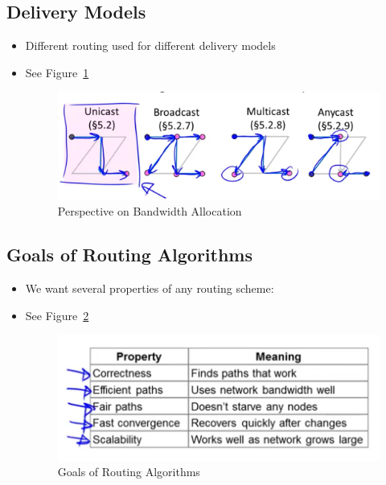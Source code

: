 \documentclass[12pt]{ctexart}   %
\begin{document}
	\subsection{Delivery Models}
	\begin{itemize}
		\item Different routing used for different delivery models
		\item See Figure~\ref{fig:5-1-4}
		
		\begin{figure}[h!] %
		\centering
		 \includegraphics[scale=0.7]{images/5-1-4}
		\caption{ Perspective on Bandwidth Allocation }
		 \label{fig:5-1-4}
		 \end{figure}
	\end{itemize}
	
	\subsection{Goals of Routing Algorithms}
	\begin{itemize}
		\item We want several properties of any routing scheme:
		\item See Figure~\ref{fig:5-1-5}
		
		\begin{figure}[h!] %
		\centering
		 \includegraphics[scale=0.7]{images/5-1-5}
		\caption{ Goals of Routing Algorithms }
		 \label{fig:5-1-5}
		 \end{figure}
	\end{itemize}
	
\end{document}
